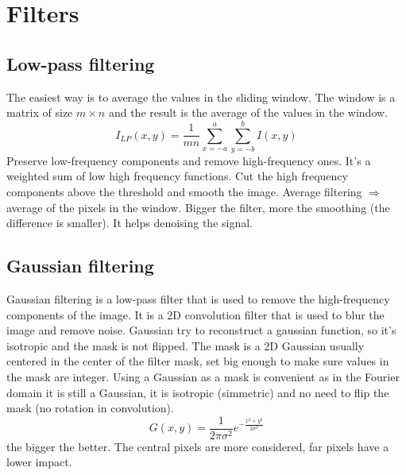 \section{Filters}
\subsection{Low-pass filtering}
The easiest way is to average the values in the sliding window. The window is a matrix of size $m \times n$ and the result is the average of the values in the window.
\[
    I_{LP}(x,y) = \frac{1}{mn} \sum_{x=-a}^{a} \sum_{y=-b}^{b} I(x,y)
\]
Preserve low-frequency components and remove high-frequency ones. It's a weighted sum of low high frequency functions. Cut the high frequency components above the threshold and smooth the image. Average filtering $\Rightarrow$ average of the pixels in the window. Bigger the filter, more the smoothing (the difference is smaller). It helps denoising the signal.

\subsection{Gaussian filtering}
Gaussian filtering is a low-pass filter that is used to remove the high-frequency components of the image. It is a 2D convolution filter that is used to blur the image and remove noise. 
Gaussian try to reconstruct a gaussian function, so it's isotropic and the mask is not flipped. The mask is a 2D Gaussian usually centered in the center of the filter mask, set big enough to make sure values in the mask are integer. Using a Gaussian as a mask is convenient as in the Fourier domain it is still a Gaussian, it is isotropic (simmetric) and no need to flip the mask (no rotation in convolution).
\[
    G(x,y) = \frac{1}{2\pi\sigma^2}e^{-\frac{x^2+y^2}{2\sigma^2}}
\]
the bigger the better. The central pixels are more considered, far pixels have a lower impact.
